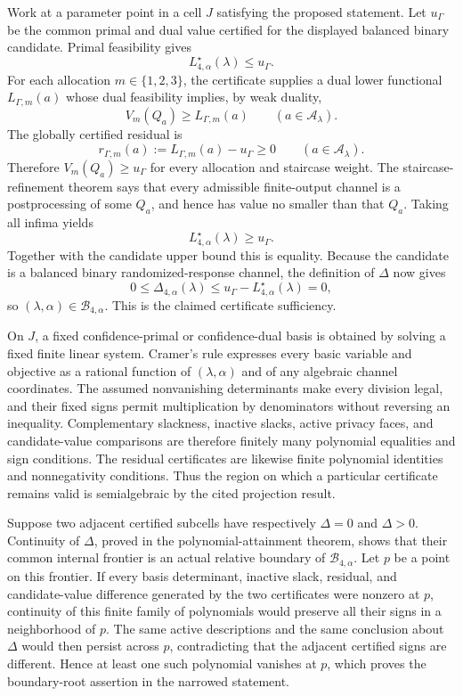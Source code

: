 Work at a parameter point in a cell \(J\) satisfying the proposed statement.  Let \(u_\Gamma\) be the common primal and dual value certified for the displayed balanced binary candidate.  Primal feasibility gives
\[
 L^\star_{4,\alpha}(\lambda)\le u_\Gamma.
\]
For each allocation \(m\in\{1,2,3\}\), the certificate supplies a dual lower functional \(L_{\Gamma,m}(a)\) whose dual feasibility implies, by weak duality,
\[
 V_m(Q_a)\ge L_{\Gamma,m}(a)
 \qquad(a\in\mathcal A_\lambda).
\]
The globally certified residual is
\[
 r_{\Gamma,m}(a):=L_{\Gamma,m}(a)-u_\Gamma\ge0
 \qquad(a\in\mathcal A_\lambda).
\]
Therefore \(V_m(Q_a)\ge u_\Gamma\) for every allocation and staircase weight.  The staircase-refinement theorem says that every admissible finite-output channel is a postprocessing of some \(Q_a\), and hence has value no smaller than that \(Q_a\).  Taking all infima yields
\[
 L^\star_{4,\alpha}(\lambda)\ge u_\Gamma.
\]
Together with the candidate upper bound this is equality.  Because the candidate is a balanced binary randomized-response channel, the definition of \(\Delta\) now gives
\[
 0\le\Delta_{4,\alpha}(\lambda)
 \le u_\Gamma-L^\star_{4,\alpha}(\lambda)=0,
\]
so \((\lambda,\alpha)\in\mathcal B_{4,\alpha}\).  This is the claimed certificate sufficiency.

On \(J\), a fixed confidence-primal or confidence-dual basis is obtained by solving a fixed finite linear system.  Cramer's rule expresses every basic variable and objective as a rational function of \((\lambda,\alpha)\) and of any algebraic channel coordinates.  The assumed nonvanishing determinants make every division legal, and their fixed signs permit multiplication by denominators without reversing an inequality.  Complementary slackness, inactive slacks, active privacy faces, and candidate-value comparisons are therefore finitely many polynomial equalities and sign conditions.  The residual certificates are likewise finite polynomial identities and nonnegativity conditions.  Thus the region on which a particular certificate remains valid is semialgebraic by the cited projection result.

Suppose two adjacent certified subcells have respectively \(\Delta=0\) and \(\Delta>0\).  Continuity of \(\Delta\), proved in the polynomial-attainment theorem, shows that their common internal frontier is an actual relative boundary of \(\mathcal B_{4,\alpha}\).  Let \(p\) be a point on this frontier.  If every basis determinant, inactive slack, residual, and candidate-value difference generated by the two certificates were nonzero at \(p\), continuity of this finite family of polynomials would preserve all their signs in a neighborhood of \(p\).  The same active descriptions and the same conclusion about \(\Delta\) would then persist across \(p\), contradicting that the adjacent certified signs are different.  Hence at least one such polynomial vanishes at \(p\), which proves the boundary-root assertion in the narrowed statement.

